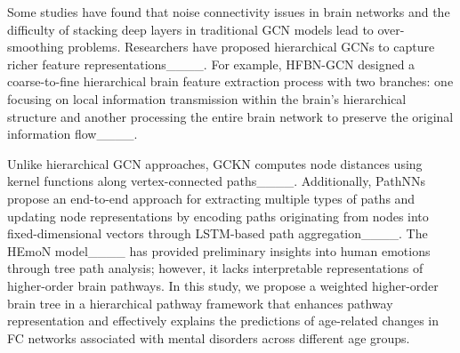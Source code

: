 Some studies have found that noise connectivity issues in brain networks and the difficulty of stacking deep layers in traditional GCN models lead to over-smoothing problems. Researchers have proposed hierarchical GCNs to capture richer feature representations____. For example, HFBN-GCN designed a coarse-to-fine hierarchical brain feature extraction process with two branches: one focusing on local information transmission within the brain's hierarchical structure and another processing the entire brain network to preserve the original information flow____.

Unlike hierarchical GCN approaches, GCKN computes node distances using kernel functions along vertex-connected paths____. Additionally, PathNNs propose an end-to-end approach for extracting multiple types of paths and updating node representations by encoding paths originating from nodes into fixed-dimensional vectors through LSTM-based path aggregation____. The HEmoN model____ has provided preliminary insights into human emotions through tree path analysis; however, it lacks interpretable representations of higher-order brain pathways. In this study, we propose a weighted higher-order brain tree in a hierarchical pathway framework that enhances pathway representation and effectively explains the predictions of age-related changes in FC networks associated with mental disorders across different age groups.